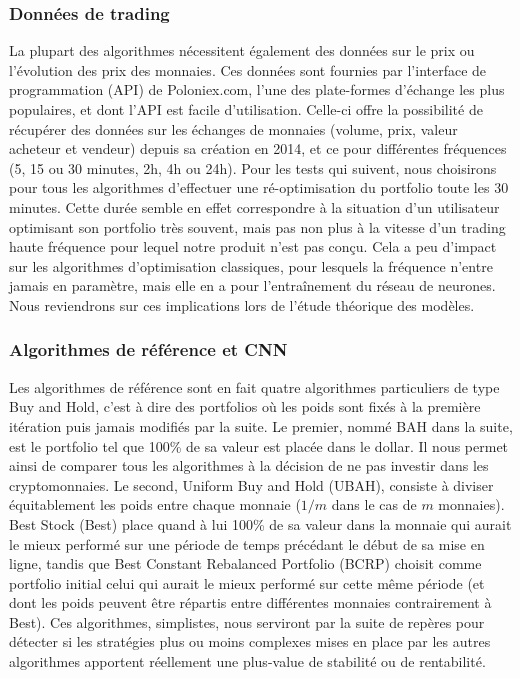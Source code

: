 \documentclass[a4paper, 10pt]{article}
\begin{document}
\subsubsection{Données de trading}
\label{sec:theorie_implem_data}

La plupart des algorithmes nécessitent également des données sur le prix ou l'évolution des prix des monnaies. Ces données sont fournies par l'interface de programmation (API) de Poloniex.com, l'une des plate-formes d'échange les plus populaires, et dont l'API est facile d'utilisation. Celle-ci offre la possibilité de récupérer des données sur les échanges de monnaies (volume, prix, valeur acheteur et vendeur) depuis sa création en 2014, et ce pour différentes fréquences (5, 15 ou 30 minutes, 2h, 4h ou 24h). Pour les tests qui suivent, nous choisirons pour tous les algorithmes d'effectuer une ré-optimisation du portfolio toute les 30 minutes. Cette durée semble en effet correspondre à la situation d'un utilisateur optimisant son portfolio très souvent, mais pas non plus à la vitesse d'un trading haute fréquence pour lequel notre produit n'est pas conçu. Cela a peu d'impact sur les algorithmes d'optimisation classiques, pour lesquels la fréquence n'entre jamais en paramètre, mais elle en a pour l'entraînement du réseau de neurones. Nous reviendrons sur ces implications lors de l'étude théorique des modèles.

\subsubsection{Algorithmes de référence et CNN}
\label{sec:theorie_implem_algo}

Les algorithmes de référence sont en fait quatre algorithmes particuliers de type Buy and Hold, c'est à dire des portfolios où les poids sont fixés à la première itération puis jamais modifiés par la suite. Le premier, nommé BAH dans la suite, est le portfolio tel que 100\% de sa valeur est placée dans le dollar. Il nous permet ainsi de comparer tous les algorithmes à la décision de ne pas investir dans les cryptomonnaies. Le second, Uniform Buy and Hold (UBAH), consiste à diviser équitablement les poids entre chaque monnaie ($1/m$ dans le cas de $m$ monnaies). Best Stock (Best) place quand à lui 100\% de sa valeur dans la monnaie qui aurait le mieux performé sur une période de temps précédant le début de sa mise en ligne, tandis que Best Constant Rebalanced Portfolio (BCRP) choisit comme portfolio initial celui qui aurait le mieux performé sur cette même période (et dont les poids peuvent être répartis entre différentes monnaies contrairement à Best). Ces algorithmes, simplistes, nous serviront par la suite de repères pour détecter si les stratégies plus ou moins complexes mises en place par les autres algorithmes apportent réellement une plus-value de stabilité ou de rentabilité.
\end{document}
